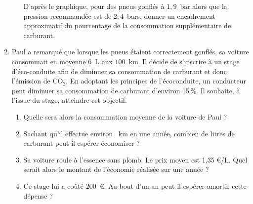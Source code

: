 \begin{enumerate}
\begin{enumerate}
D'après le graphique, pour des pneus gonflés à $1,9$~bar alors que la pression recommandée est de $2,4$~bars, donner un encadrement approximatif du pourcentage de la consommation supplémentaire de carburant.
	\end{enumerate}
\item  Paul a remarqué que lorsque les pneus étaient correctement gonflés, sa voiture consommait
en moyenne $6$~L aux $100$~km. Il décide de s'inscrire à un stage d'éco-conduite afin de diminuer
sa consommation de carburant et donc l'émission de CO$_2$. En adoptant les principes de l'écoconduite, un conducteur peut diminuer sa consommation de carburant d'environ 15\,\%. Il
souhaite, à l'issue du stage, atteindre cet objectif.
	\begin{enumerate}
		\item Quelle sera alors la consommation moyenne de la voiture de Paul ?
		\item Sachant qu'il effectue environ ~km en une année, combien de litres de carburant
peut-il espérer économiser ?
		\item Sa voiture roule à l'essence sans plomb. Le prix moyen est 1,35 €/L. Quel serait alors le montant de l'économie réalisée sur une année ?
		\item Ce stage lui a coûté $200$~\euro. Au bout d'un an peut-il espérer amortir cette dépense ?
	\end{enumerate}
\end{enumerate}

\bigskip

